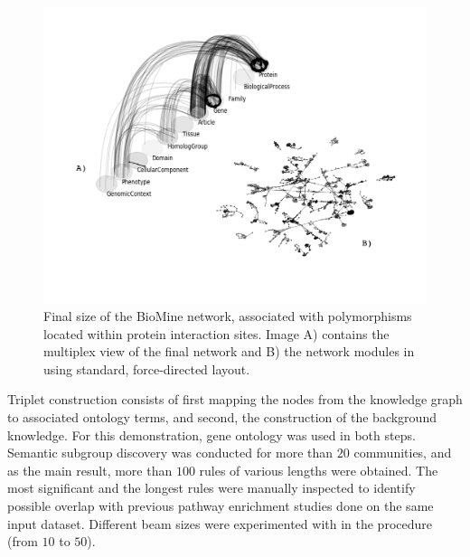 \documentclass[oribibl,runningheads,a4paper]{llncs}
\begin{document}
\begin{figure}[!t]
\centering
\includegraphics[scale=0.52]{combined_biomine_grayscale}
\caption{Final size of the BioMine network, associated with polymorphisms located within protein interaction sites. Image A) contains the multiplex view of the final network and B) the network modules in using standard, force-directed layout.}
\label{fig:example2}
\end{figure}


Triplet construction consists of first mapping the nodes from the knowledge graph to associated ontology terms, and second, the construction of the background knowledge. For this demonstration, gene ontology \cite{ashburner2000gene} was used in both steps. 
Semantic subgroup discovery was conducted for more than $20$ communities, and as the main result, more than $100$ rules of various lengths were obtained. The most significant and the longest rules were manually inspected to identify possible overlap with previous pathway enrichment studies done on the same input dataset. Different beam sizes were experimented with in the procedure (from $10$ to $50$). 
\end{document}
